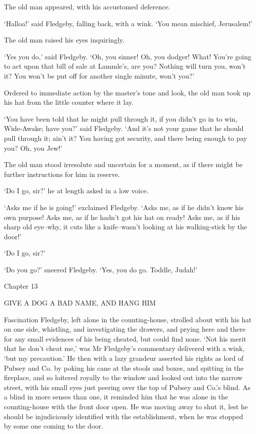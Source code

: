 The old man appeared, with his accustomed deference.

‘Halloa!’ said Fledgeby, falling back, with a wink. ‘You mean mischief,
Jerusalem!’

The old man raised his eyes inquiringly.

‘Yes you do,’ said Fledgeby. ‘Oh, you sinner! Oh, you dodger! What!
You’re going to act upon that bill of sale at Lammle’s, are you? Nothing
will turn you, won’t it? You won’t be put off for another single minute,
won’t you?’

Ordered to immediate action by the master’s tone and look, the old man
took up his hat from the little counter where it lay.

‘You have been told that he might pull through it, if you didn’t go in
to win, Wide-Awake; have you?’ said Fledgeby. ‘And it’s not your game
that he should pull through it; ain’t it? You having got security, and
there being enough to pay you? Oh, you Jew!’

The old man stood irresolute and uncertain for a moment, as if there
might be further instructions for him in reserve.

‘Do I go, sir?’ he at length asked in a low voice.

‘Asks me if he is going!’ exclaimed Fledgeby. ‘Asks me, as if he didn’t
know his own purpose! Asks me, as if he hadn’t got his hat on ready!
Asks me, as if his sharp old eye--why, it cuts like a knife--wasn’t
looking at his walking-stick by the door!’

‘Do I go, sir?’

‘Do you go?’ sneered Fledgeby. ‘Yes, you do go. Toddle, Judah!’



Chapter 13

GIVE A DOG A BAD NAME, AND HANG HIM


Fascination Fledgeby, left alone in the counting-house, strolled about
with his hat on one side, whistling, and investigating the drawers, and
prying here and there for any small evidences of his being cheated,
but could find none. ‘Not his merit that he don’t cheat me,’ was Mr
Fledgeby’s commentary delivered with a wink, ‘but my precaution.’ He
then with a lazy grandeur asserted his rights as lord of Pubsey and
Co. by poking his cane at the stools and boxes, and spitting in the
fireplace, and so loitered royally to the window and looked out into the
narrow street, with his small eyes just peering over the top of Pubsey
and Co.’s blind. As a blind in more senses than one, it reminded him
that he was alone in the counting-house with the front door open. He was
moving away to shut it, lest he should be injudiciously identified with
the establishment, when he was stopped by some one coming to the door.

